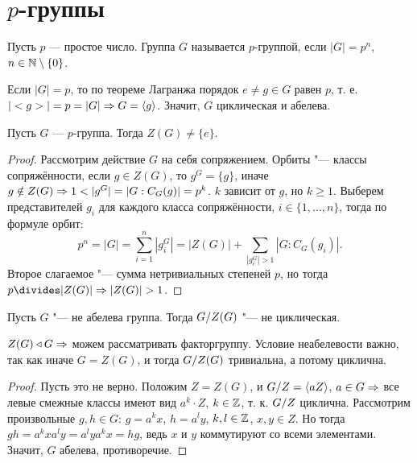 \documentclass[main]{subfiles}
\begin{document}
\section{$p$-группы}
\begin{definition}
  Пусть $p$ --- простое число. Группа $G$ называется $p$-группой, если
  $|G| = p^n$, $n \in \mathbb{N} \setminus \{ 0 \}$.
\end{definition}
\begin{example}
  Если $|G| = p$, то по теореме Лагранжа
  порядок $e \ne g \in G$ равен $p$, т. е.
  $|<g>| = p = |G| \Rightarrow G = \langle g \rangle$.
  Значит, $G$ циклическая и абелева.
\end{example}

\begin{theorem}
  Пусть $G$ --- $p$-группа. Тогда $Z(G) \ne \{ e \}$.
\end{theorem}
\begin{proof}
  Рассмотрим действие \( G \) на себя сопряжением.
  Орбиты "--- классы сопряжённости,
  если \( g \in Z(G) \), то \( g^G = \{ g \} \),
  иначе \( g \notin Z(G) \Rightarrow
  1 < |g^G| = |G : C_G(g)| = p^k \).
  \( k \) зависит от \( g \), но \( k \ge 1 \).
  Выберем представителей \( g_i \) для каждого
  класса сопряжённости, \( i \in \{ 1, \dots, n \} \),
  тогда по формуле орбит:
  \[
    p^n = |G| = \sum_{i = 1}^n |g_i^G| =
    |Z(G)| + {\sum_{|g_i^{G}| > 1} |G : C_G(g_i)|}.
  \]
  Второе слагаемое "---
  сумма нетривиальных степеней \( p \),
  но тогда \( p \divides |Z(G)| \To |Z(G)| > 1 \).
\end{proof}

\begin{theorem}
  Пусть \( G \) "--- не абелева группа.
  Тогда \( \Factor{G}[Z(G)] \) "--- не циклическая.
\end{theorem}
\begin{remark}
  \( Z(G) \triangleleft G \Rightarrow \) можем рассматривать факторгруппу.
  Условие неабелевости важно, так как
  иначе \( G = Z(G) \),
  и тогда \( \Factor{G}[Z(G)] \) тривиальна, а потому циклична.
\end{remark}
\begin{proof}
  Пусть это не верно.
  Положим \( Z = Z(G) \),
  и \( \Factor{G}[Z] = \langle a Z \rangle \),
  \( a \in G \Rightarrow \) все левые смежные классы имеют вид
  \( a^k \cdot Z \), \( k \in \mathbb{Z} \),
  т. к. \( \Factor{G}[Z] \) циклична.
  Рассмотрим произвольные \( g, h \in G \):
  \( g = a^k x \), \( h = a^l y \),
  \( k, l \in \mathbb{Z} \), \( x, y \in Z \).
  Но тогда \( gh = a^k x a^l y = a^l y a^k x = hg \),
  ведь \( x \) и \( y \) коммутируют со всеми элементами.
  Значит, \( G \) абелева, противоречие.
\end{proof}
\end{document}
